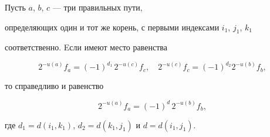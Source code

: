 \begin{lem}


Пусть $a$, $b$, $c$ --- три правильных пути,


определяющих один и тот же корень, с первыми индексами $i_1$, $j_1$, $k_1$


соответственно. Eсли имеют место равенства


\begin{equation}


2^{-u(a)}f_a=(-1)^{d_1}\,2^{-u(c)}f_c,\quad


2^{-u(c)}f_c=(-1)^{d_2}2^{-u(b)}f_b,


\end{equation}


то справедливо и равенство


\begin{equation}


2^{-u(a)}f_a=(-1)^d\,2^{-u(b)}f_b,


\end{equation}


где $d_1=d(i_1,k_1)$, $d_2=d(k_1,j_1)$ и $d=d(i_1,j_1)$.


\end{lem}





